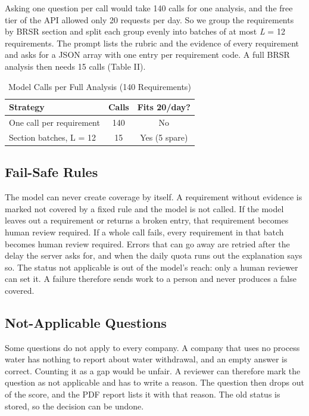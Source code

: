 \documentclass[conference]{IEEEtran}
\begin{document}
Asking one question per call would take 140 calls for one analysis, and the free tier of the API allowed only 20 requests per day. So we group the requirements by BRSR section and split each group evenly into batches of at most \textit{L} = 12 requirements. The prompt lists the rubric and the evidence of every requirement and asks for a JSON array with one entry per requirement code. A full BRSR analysis then needs 15 calls (Table II).

\begin{table}[!t]\centering\caption{Model Calls per Full Analysis (140 Requirements)}
\footnotesize\begin{tabular}{lcc}\toprule
Strategy & Calls & Fits 20/day? \\ \midrule
One call per requirement & 140 & No \\
Section batches, L = 12 & 15 & Yes (5 spare) \\
\bottomrule\end{tabular}
\end{table}
\subsection{Fail-Safe Rules}
The model can never create coverage by itself. A requirement without evidence is marked not covered by a fixed rule and the model is not called. If the model leaves out a requirement or returns a broken entry, that requirement becomes human review required. If a whole call fails, every requirement in that batch becomes human review required. Errors that can go away are retried after the delay the server asks for, and when the daily quota runs out the explanation says so. The status not applicable is out of the model's reach: only a human reviewer can set it. A failure therefore sends work to a person and never produces a false covered.

\subsection{Not-Applicable Questions}
Some questions do not apply to every company. A company that uses no process water has nothing to report about water withdrawal, and an empty answer is correct. Counting it as a gap would be unfair. A reviewer can therefore mark the question as not applicable and has to write a reason. The question then drops out of the score, and the PDF report lists it with that reason. The old status is stored, so the decision can be undone.
\end{document}
